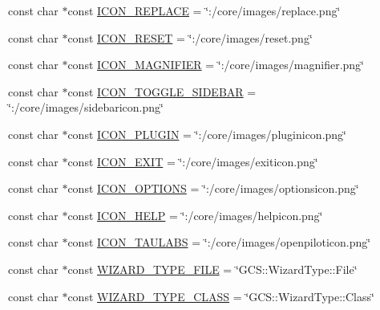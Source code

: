 \begin{DoxyCompactItemize}
\item 
const char $\ast$const \hyperlink{group___core_plugin_gae0384d1d37d0903712f93ddbb23151ef}{I\-C\-O\-N\-\_\-\-R\-E\-P\-L\-A\-C\-E} = \char`\"{}\-:/core/images/replace.\-png\char`\"{}
\item 
const char $\ast$const \hyperlink{group___core_plugin_ga454f3d18360ca06c47eff68a75b1c868}{I\-C\-O\-N\-\_\-\-R\-E\-S\-E\-T} = \char`\"{}\-:/core/images/reset.\-png\char`\"{}
\item 
const char $\ast$const \hyperlink{group___core_plugin_ga1e2534739ffcaae9d53b457e978b838a}{I\-C\-O\-N\-\_\-\-M\-A\-G\-N\-I\-F\-I\-E\-R} = \char`\"{}\-:/core/images/magnifier.\-png\char`\"{}
\item 
const char $\ast$const \hyperlink{group___core_plugin_gaabc42a8c430c6106655594c1bf624b9e}{I\-C\-O\-N\-\_\-\-T\-O\-G\-G\-L\-E\-\_\-\-S\-I\-D\-E\-B\-A\-R} = \char`\"{}\-:/core/images/sidebaricon.\-png\char`\"{}
\item 
const char $\ast$const \hyperlink{group___core_plugin_ga9f234fb33ceb5b9f3f840c6934e979ed}{I\-C\-O\-N\-\_\-\-P\-L\-U\-G\-I\-N} = \char`\"{}\-:/core/images/pluginicon.\-png\char`\"{}
\item 
const char $\ast$const \hyperlink{group___core_plugin_ga8dcf1931b14f2911a175a1946d94afb8}{I\-C\-O\-N\-\_\-\-E\-X\-I\-T} = \char`\"{}\-:/core/images/exiticon.\-png\char`\"{}
\item 
const char $\ast$const \hyperlink{group___core_plugin_gac73aa396739bdb0badac34e06112b536}{I\-C\-O\-N\-\_\-\-O\-P\-T\-I\-O\-N\-S} = \char`\"{}\-:/core/images/optionsicon.\-png\char`\"{}
\item 
const char $\ast$const \hyperlink{group___core_plugin_gacfd62907dace8bb425a3d9d01e953de6}{I\-C\-O\-N\-\_\-\-H\-E\-L\-P} = \char`\"{}\-:/core/images/helpicon.\-png\char`\"{}
\item 
const char $\ast$const \hyperlink{group___core_plugin_ga04096dc16c442e5d5ececcfbcf814d16}{I\-C\-O\-N\-\_\-\-T\-A\-U\-L\-A\-B\-S} = \char`\"{}\-:/core/images/openpiloticon.\-png\char`\"{}
\item 
const char $\ast$const \hyperlink{group___core_plugin_gaf62e2001aebfd40c32959c72bbcde85e}{W\-I\-Z\-A\-R\-D\-\_\-\-T\-Y\-P\-E\-\_\-\-F\-I\-L\-E} = \char`\"{}G\-C\-S\-::\-Wizard\-Type\-::\-File\char`\"{}
\item 
const char $\ast$const \hyperlink{group___core_plugin_ga1d52af0d7f4a06e08434978debff7211}{W\-I\-Z\-A\-R\-D\-\_\-\-T\-Y\-P\-E\-\_\-\-C\-L\-A\-S\-S} = \char`\"{}G\-C\-S\-::\-Wizard\-Type\-::\-Class\char`\"{}
\end{DoxyCompactItemize}
